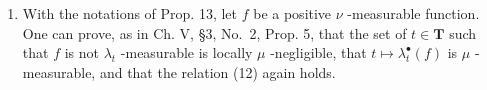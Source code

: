 \begin{enumerate}
\def\labelenumi{\arabic{enumi})}
\setcounter{enumi}{1}
\tightlist
\item
  With the notations of Prop. 13, let \(f\) be a positive \(\nu\) -measurable function. One can prove, as in Ch. V, §3, No.~2, Prop. 5, that the set of \(t \in \mathbf{T}\) such that \(f\) is not \(\lambda_t\) -measurable is locally \(\mu\) -negligible, that \(t \mapsto \lambda_t^\bullet(f)\) is \(\mu\) -measurable, and that the relation (12) again holds.
\end{enumerate}


